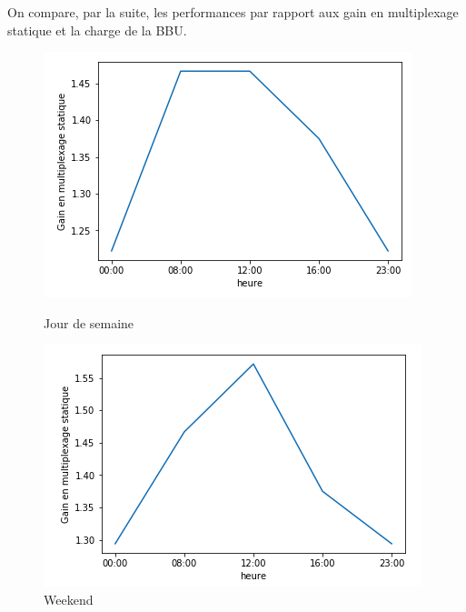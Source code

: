 \documentclass{report}
\begin{document}
On compare, par la suite, les performances par rapport aux gain en multiplexage statique et la charge de la BBU.
\begin{figure}[H]
  \begin{minipage}{0.4\textwidth}
    \centering
    \includegraphics[scale=0.55]{images/gain_semaine.png}
    \caption{Jour de semaine}\label{Fig:Data1}
  \end{minipage}\hfill
  \begin{minipage}{0.4\textwidth}
    \centering
    \includegraphics[scale=0.55]{images/gain_wd.png}
    \caption{Weekend}\label{Fig:Data2}
  \end{minipage}
\end{figure} 
\end{document}
